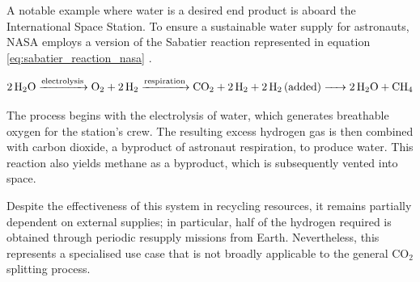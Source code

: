 A notable example where water is a desired end product is aboard the International Space Station. To ensure a sustainable water supply for astronauts, NASA employs a version of the Sabatier reaction represented in equation \ref{eq:sabatier_reaction_nasa} \cite{the_sabatier_system}.

\begin{equation}
    \ce{2H_2O ->[ electrolysis ] O_2 + 2H_2 ->[ respiration ] CO_2 + 2H_2 + 2H_2 (added) -> 2H_2O + CH_4 }
    \label{eq:sabatier_reaction_nasa}
\end{equation}

The process begins with the electrolysis of water, which generates breathable oxygen for the station’s crew. The resulting excess hydrogen gas is then combined with carbon dioxide, a byproduct of astronaut respiration, to produce water. This reaction also yields methane as a byproduct, which is subsequently vented into space.

Despite the effectiveness of this system in recycling resources, it remains partially dependent on external supplies; in particular, half of the hydrogen required is obtained through periodic resupply missions from Earth. Nevertheless, this represents a specialised use case that is not broadly applicable to the general CO$_2$ splitting process.



